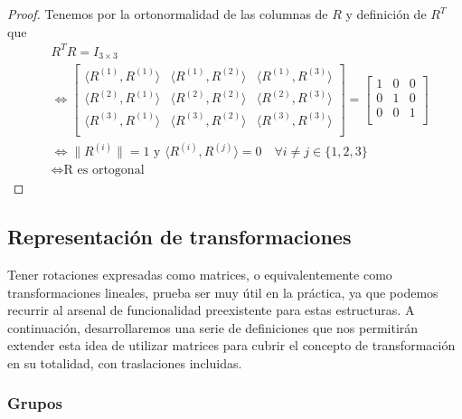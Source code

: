 \documentclass[ twoside,openright,titlepage,numbers=noenddot,%
                headinclude,footinclude,cleardoublepage=empty,abstract=on,
                BCOR=-5mm,paper=a4,fontsize=11pt
                ]{scrreprt}
\newcommand{\dotprod}[2]{\langle #1, #2 \rangle}
\begin{document}
\bigbreak

\begin{proof}Tenemos por la ortonormalidad de las columnas de \(R\) y
definición de \(R^T\) que \begin{align}
  & R^T R = I_{3 \times 3} \\
  & \Leftrightarrow \begin{bmatrix}
  \dotprod{R^{(1)}}{R^{(1)}} & \dotprod{R^{(1)}}{R^{(2)}} & \dotprod{R^{(1)}}{R^{(3)}} \\
  \dotprod{R^{(2)}}{R^{(1)}} & \dotprod{R^{(2)}}{R^{(2)}} & \dotprod{R^{(2)}}{R^{(3)}} \\
  \dotprod{R^{(3)}}{R^{(1)}} & \dotprod{R^{(3)}}{R^{(2)}} & \dotprod{R^{(3)}}{R^{(3)}} \\
  \end{bmatrix} = \begin{bmatrix}
1 & 0 & 0 \\
0 & 1 & 0 \\
0 & 0 & 1 \\
  \end{bmatrix} \\
  & \Leftrightarrow \| R^{(i)} \| = 1 \text{ y } \dotprod{R^{(i)}}{R^{(j)}} = 0 \quad \forall i \neq j \in \{1,2,3\} \\
  & \Leftrightarrow \text{R es ortogonal}
\end{align}\end{proof}

\bigbreak

\hypertarget{representaciuxf3n-de-transformaciones}{%
\subsection{Representación de
transformaciones}\label{representaciuxf3n-de-transformaciones}}

Tener rotaciones expresadas como matrices, o equivalentemente como
transformaciones lineales, prueba ser muy útil en la práctica, ya que
podemos recurrir al arsenal de funcionalidad preexistente para estas
estructuras. A continuación, desarrollaremos una serie de definiciones
que nos permitirán extender esta idea de utilizar matrices para cubrir
el concepto de transformación en su totalidad, con traslaciones
incluidas.

\hypertarget{grupos}{%
\subsubsection{Grupos}\label{grupos}}
\end{document}
